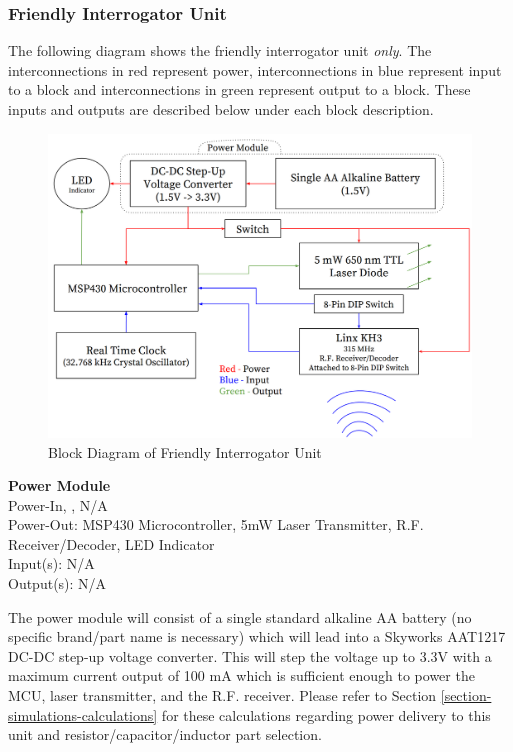 \documentclass[letterpaper,10pt]{article}
\begin{document}
\begin{spacing}{1.15}
\subsubsection{Friendly Interrogator Unit} \label{section-friendly-interrogator-design}
The following diagram shows the friendly interrogator unit \textit{only}. The interconnections in red represent power, interconnections in blue represent input to a block and interconnections in green represent output to a block. These inputs and outputs are described below under each block description.
\begin{figure} [H]
\centering
\includegraphics[scale=0.5]{Friendly_Interrogator_Block_Diagram.png}
\caption{Block Diagram of Friendly Interrogator Unit\label{fig:friendly-interrogator-block}}
\end{figure}

\normalsize\textbf{Power Module} \\
Power-In, ,  N/A \\
Power-Out: MSP430 Microcontroller, 5mW Laser Transmitter, R.F. Receiver/Decoder, LED Indicator \\
Input(s): N/A\\
Output(s): N/A

The power module will consist of a single standard alkaline AA battery (no specific brand/part name is necessary) which will lead into a Skyworks AAT1217 DC-DC step-up voltage converter. This will step the voltage up to 3.3V with a maximum current output of 100 mA which is sufficient enough to power the MCU, laser transmitter, and the R.F. receiver. Please refer to Section \ref{section-simulations-calculations} for these calculations regarding power delivery to this unit and resistor/capacitor/inductor part selection. 


\end{spacing}
\end{document}
